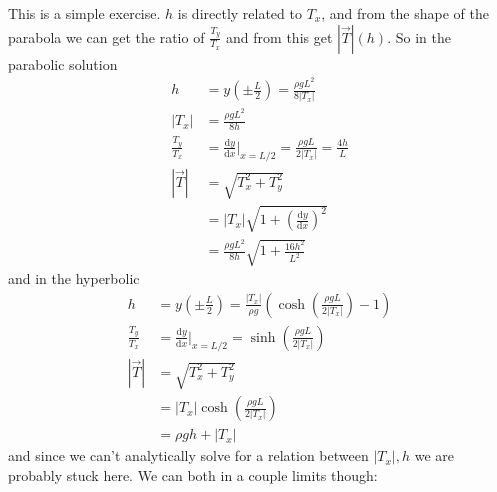 \documentclass[12pt]{report}
\newcommand{\rd}[2]{\frac{\mathrm{d}#1}{\mathrm{d}#2}}
\newcommand{\abs}[1]{\left|#1\right|}
\begin{document}
This is a simple exercise. $h$ is directly related to $T_x$, and from the shape
of the parabola we can get the ratio of $\frac{T_y}{T_x}$ and from this get
$\abs{\vec{T}}(h)$. So in the parabolic solution
\begin{align}
    h &= y\left( \pm \frac{L}{2} \right) = \frac{\rho g L^2}{8\abs{T_x}}
        \nonumber\\
    \abs{T_x} &= \frac{\rho g L^2}{8h}\nonumber\\
    \frac{T_y}{T_x} &= \rd{y}{x}\Bigg|_{x=L/2} = \frac{\rho g L}{2\abs{T_x}} =
        \frac{4h}{L}\nonumber\\
    \abs{\vec{T}} &= \sqrt{T_x^2 + T_y^2}\nonumber\\
    &= \abs{T_x}\sqrt{1 + \left(\rd{y}{x}\right)^2}\nonumber\\
    &= \frac{\rho g L^2}{8h}\sqrt{1 + \frac{16h^2}{L^2}}
\end{align}
and in the hyperbolic
\begin{align}
    h &= y\left( \pm \frac{L}{2} \right) = \frac{\abs{T_x}}{\rho g} \left(
        \cosh\left( \frac{\rho g L}{2\abs{T_x}} \right)
        - 1\right)
        \nonumber\\
    \frac{T_y}{T_x} &= \rd{y}{x}\Bigg|_{x=L/2} = \sinh \left(
        \frac{\rho g L}{2 \abs{T_x}}
    \right)\nonumber\\
    \abs{\vec{T}} &= \sqrt{T_x^2 + T_y^2}\nonumber\\
    &= \abs{T_x} \cosh \left( \frac{\rho g L}{2 \abs{T_x}} \right) \nonumber\\
    &= \rho g h + \abs{T_x}
\end{align}
and since we can't analytically solve for a relation between $\abs{T_x}, h$
we are probably stuck here. We can both in a couple limits though:
\end{document}
